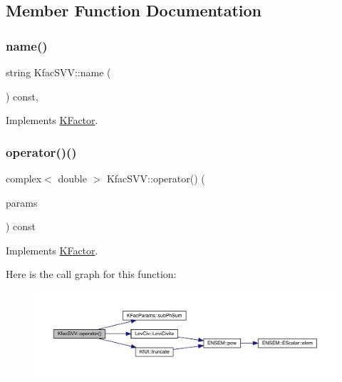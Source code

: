 \subsection{Member Function Documentation}
\mbox{\label{classKfacSVV_ad7ab40ec924a678cd785a9743e676d6c}} 
\subsubsection{\texorpdfstring{name()}{name()}}
{\footnotesize\ttfamily string Kfac\+S\+V\+V\+::name (\begin{DoxyParamCaption}{ }\end{DoxyParamCaption}) const\hspace{0.3cm}{\ttfamily [inline]}, {\ttfamily [virtual]}}



Implements \mbox{\hyperlink{classKFactor_ae578f8d6e4b525895427717da99cab6c}{K\+Factor}}.

\mbox{\label{classKfacSVV_abc4b565ae1fbf1109bbed4b05b3d5ee7}} 
\subsubsection{\texorpdfstring{operator()()}{operator()()}}
{\footnotesize\ttfamily complex$<$ double $>$ Kfac\+S\+V\+V\+::operator() (\begin{DoxyParamCaption}\item[{const \mbox{\hyperlink{classKFacParams}{K\+Fac\+Params}} \&}]{params }\end{DoxyParamCaption}) const\hspace{0.3cm}{\ttfamily [virtual]}}



Implements \mbox{\hyperlink{classKFactor_a4273897de4ef590083c7ef208b8d0f18}{K\+Factor}}.

Here is the call graph for this function\+:
\nopagebreak
\begin{figure}[H]
\begin{center}
\leavevmode
\includegraphics[width=350pt]{d3/d61/classKfacSVV_abc4b565ae1fbf1109bbed4b05b3d5ee7_cgraph}
\end{center}
\end{figure}


